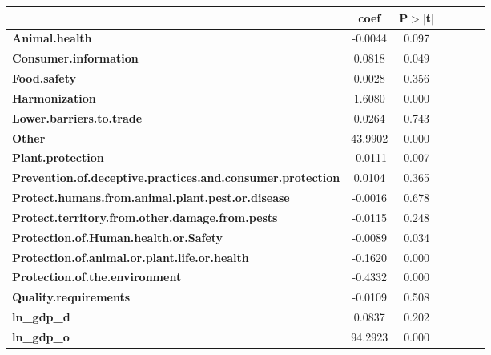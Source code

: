 \begin{table}[ht]
\begin{center}
        
        \begin{tabular}{lcccccc}
            & \textbf{coef} &\textbf{P$> |$t$|$}\\
\midrule
\textbf{Animal.health}                                             &      -0.0044 &        0.097       \\
\textbf{Consumer.information}                                      &       0.0818 &        0.049       \\
\textbf{Food.safety}                                               &       0.0028 &        0.356       \\
\textbf{Harmonization}                                             &       1.6080 &        0.000       \\
\textbf{Lower.barriers.to.trade}                                   &       0.0264 &        0.743       \\
\textbf{Other}                                                     &      43.9902 &        0.000       \\
\textbf{Plant.protection}                                          &      -0.0111 &        0.007       \\
\textbf{Prevention.of.deceptive.practices.and.consumer.protection} &       0.0104 &        0.365       \\
\textbf{Protect.humans.from.animal.plant.pest.or.disease}          &      -0.0016 &        0.678       \\
\textbf{Protect.territory.from.other.damage.from.pests}            &      -0.0115 &        0.248       \\
\textbf{Protection.of.Human.health.or.Safety}                      &      -0.0089 &        0.034       \\
\textbf{Protection.of.animal.or.plant.life.or.health}              &      -0.1620 &        0.000       \\
\textbf{Protection.of.the.environment}                             &      -0.4332 &        0.000       \\
\textbf{Quality.requirements}                                      &      -0.0109 &        0.508       \\
\textbf{ln\_gdp\_d}                                                &       0.0837 &        0.202       \\
\textbf{ln\_gdp\_o}                                                &      94.2923 &        0.000       \\

\end{tabular}
\end{center}
\end{table}
